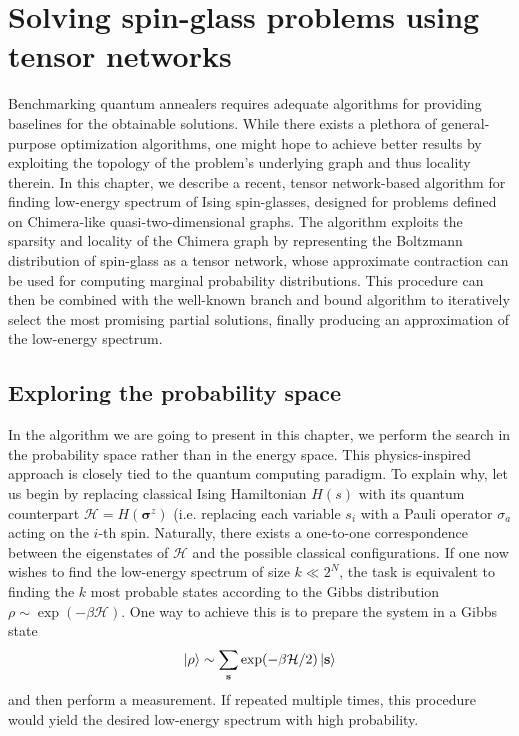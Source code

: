 \chapter{Solving spin-glass problems using tensor networks}
\label{chapter:tn}

Benchmarking quantum annealers requires adequate algorithms for providing
baselines for the obtainable solutions. While
there exists a plethora of general-purpose optimization algorithms, one might
hope to achieve better results by exploiting the topology of the problem's
underlying graph and thus locality therein. In this chapter, we describe a
recent, tensor network-based algorithm for finding low-energy spectrum of Ising
spin-glasses, designed for problems defined on Chimera-like
quasi-two-dimensional graphs. The algorithm exploits the sparsity and locality
of the Chimera graph by representing the Boltzmann distribution of spin-glass
as a tensor network, whose approximate contraction can be used for computing
marginal probability distributions. This procedure can then be combined with
the well-known branch and bound algorithm to iteratively select the most
promising partial solutions, finally producing an approximation of the
low-energy spectrum.

\section{Exploring the probability space}

In the algorithm we are going to present in this chapter, we perform
the search in the probability space rather than in the energy space. This physics-inspired
approach is closely tied to the quantum computing paradigm.
To explain why, let us begin by replacing classical Ising Hamiltonian $H(s)$ with its quantum
counterpart $\mathcal{H} = H(\boldsymbol{\sigma}^{z})$ (i.e. replacing each variable
$s_{i}$ with a Pauli operator $\sigma_{a}$ acting on the $i$-th spin.
Naturally, there exists a one-to-one correspondence between the eigenstates of
$\mathcal{H}$ and the possible classical configurations. If one now wishes to
find the low-energy spectrum of size $k \ll 2^{N}$, the task is equivalent to finding
the $k$ most probable states according to the Gibbs distribution
$\rho \sim \exp(-\beta \mathcal{H})$. One way to achieve this is to prepare the system in a Gibbs state
\begin{equation}
\ket{\rho} \sim \sum_{\mathbf{s}} \exp(-\beta \mathcal{H}/2)\ket{\mathbf{s}}
\end{equation}
and then perform a measurement. If repeated multiple times, this procedure would yield
the desired low-energy spectrum with high probability.

